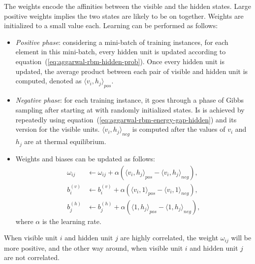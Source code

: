 The weights encode the affinities between the visible and the hidden states.
Large positive weights implies the two states are likely to be on together.
Weights are initialized to a small value each.
Learning can be performed as follows:
\begin{itemize}
    \item \textit{Positive phase}: considering a mini-batch of training instances, for each element in this mini-batch, every hidden unit is updated according to equation~(\ref{eq:aggarwal-rbm-hidden-prob}).
    Once every hidden unit is updated, the average product between each pair of visible and hidden unit is computed, denoted as ${\langle v_{i}, h_{j} \rangle}_{pos}$.
    
    \item \textit{Negative phase}: for each training instance, it goes through a phase of Gibbs sampling after starting at with randomly initialized states.
    Is is achieved by repeatedly using equation~(\ref{eq:aggarwal-rbm-energy-gap-hidden}) and its version for the visible units.
    ${\langle v_{i}, h_{j} \rangle}_{neg}$ is computed after the values of $v_{i}$ and $h_{j}$ are at thermal equilibrium.
    
    \item Weights and biases can be updated as follows:
    \begin{equation}
        \label{eq:aggarwal-weights-bias-update}
        \begin{split}
            \omega_{ij} &\leftarrow \omega_{ij} + \alpha ({\langle v_{i}, h_{j} \rangle}_{pos} - {\langle v_{i}, h_{j} \rangle}_{neg}), \\
            b^{(v)}_{i} &\leftarrow b^{(v)}_{i} + \alpha ({\langle v_{i}, 1 \rangle}_{pos} - {\langle v_{i}, 1 \rangle}_{neg}), \\
            b^{(h)}_{j} &\leftarrow  b^{(h)}_{j} + \alpha ({\langle 1, h_{j} \rangle}_{pos} - {\langle 1, h_{j} \rangle}_{neg}), 
        \end{split}
    \end{equation}
    where $\alpha$ is the learning rate.
\end{itemize}

When visible unit $i$ and hidden unit $j$ are highly correlated, the weight $\omega_{ij}$ will be more positive, and the other way around, when visible unit $i$ and hidden unit $j$ are not correlated.

